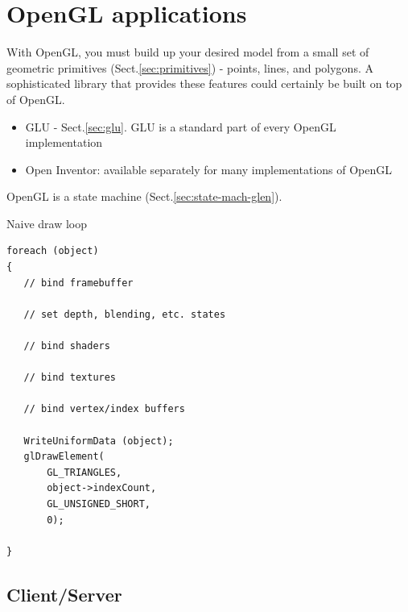 \chapter{OpenGL applications}
\label{chap:OpenGL_app}


With OpenGL, you must build up your desired model from a small set of geometric
primitives (Sect.\ref{sec:primitives}) - points, lines, and polygons.
A sophisticated library that provides these features could certainly be built on top of OpenGL.
\begin{itemize}
  \item GLU - Sect.\ref{sec:glu}. GLU is a standard part of every OpenGL
  implementation
  
  \item Open Inventor: available separately for many implementations of OpenGL
\end{itemize}

OpenGL is a state machine (Sect.\ref{sec:state-mach-glen}).

Naive draw loop
\begin{lstlisting}
foreach (object) 
{
   // bind framebuffer
   
   // set depth, blending, etc. states
   
   // bind shaders
   
   // bind textures
    
   // bind vertex/index buffers
   
   WriteUniformData (object);
   glDrawElement(
       GL_TRIANGLES,
       object->indexCount,
       GL_UNSIGNED_SHORT,
       0);

}
\end{lstlisting}



\section{Client/Server}
\label{sec:clientserver}

